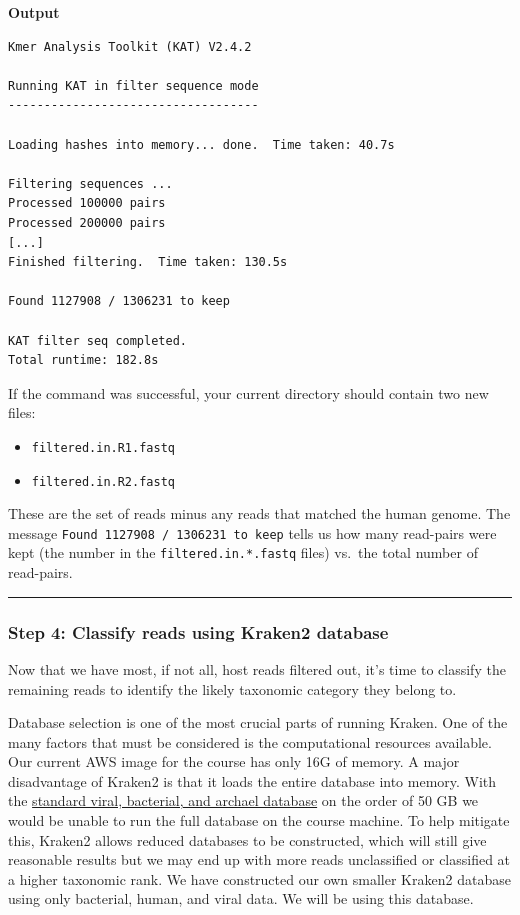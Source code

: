 \documentclass[
]{book}
\providecommand{\tightlist}{%
  \setlength{\itemsep}{0pt}\setlength{\parskip}{0pt}}
\begin{document}
\textbf{Output}

\begin{verbatim}
Kmer Analysis Toolkit (KAT) V2.4.2

Running KAT in filter sequence mode
-----------------------------------

Loading hashes into memory... done.  Time taken: 40.7s

Filtering sequences ...
Processed 100000 pairs
Processed 200000 pairs
[...]
Finished filtering.  Time taken: 130.5s

Found 1127908 / 1306231 to keep

KAT filter seq completed.
Total runtime: 182.8s
\end{verbatim}

If the command was successful, your current directory should contain two new files:

\begin{itemize}
\tightlist
\item
  \texttt{filtered.in.R1.fastq}
\item
  \texttt{filtered.in.R2.fastq}
\end{itemize}

These are the set of reads minus any reads that matched the human genome. The message \texttt{Found\ 1127908\ /\ 1306231\ to\ keep} tells us how many read-pairs were kept (the number in the \texttt{filtered.in.*.fastq} files) vs.~the total number of read-pairs.

\begin{center}\rule{0.5\linewidth}{0.5pt}\end{center}

\subsubsection{Step 4: Classify reads using Kraken2 database}\label{exercise-classify-kraken}

Now that we have most, if not all, host reads filtered out, it's time to classify the remaining reads to identify the likely taxonomic category they belong to.

Database selection is one of the most crucial parts of running Kraken. One of the many factors that must be considered is the computational resources available. Our current AWS image for the course has only 16G of memory. A major disadvantage of Kraken2 is that it loads the entire database into memory. With the \href{https://benlangmead.github.io/aws-indexes/k2}{standard viral, bacterial, and archael database} on the order of 50 GB we would be unable to run the full database on the course machine. To help mitigate this, Kraken2 allows reduced databases to be constructed, which will still give reasonable results but we may end up with more reads unclassified or classified at a higher taxonomic rank. We have constructed our own smaller Kraken2 database using only bacterial, human, and viral data. We will be using this database.
\end{document}
